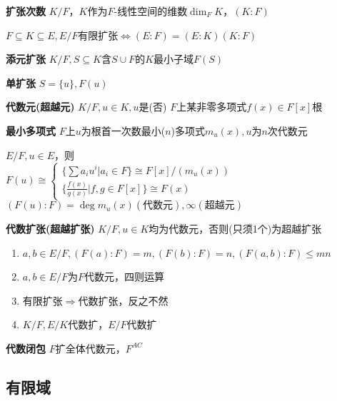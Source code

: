 \documentclass[b4paper, 10pt]{ctexart}
\newcommand*{\impl}{\Rightarrow}
\renewcommand*{\iff}{\Leftrightarrow}
\renewcommand*{\leq}{\leqslant}
\newcommand*{\set}[1]{\{#1\}}
\begin{document}
\begin{multicols}{3}
    \textbf{扩张次数} $K/F$，$K$作为$F$-线性空间的维数$\dim_F K$，$(K:F)$

    \begin{theorem}[链式法则]
        $F\subseteq K \subseteq E, E/F$有限扩张$\iff (E:F)=(E:K)(K:F)$
    \end{theorem}

    \textbf{添元扩张} $K/F, S \!\!\subseteq\!\! K$含$S \!\cup\! F$的$K$最小子域$F(S)$

    \textbf{单扩张} $S = \set{u}, F(u)$

    \textbf{代数元(超越元)} $K/F, u\in K, u$是(否) $F$上某非零多项式$f(x)\in F[x]$根

    \textbf{最小多项式} $F$上$u$为根首一次数最小($n$)多项式$m_u(x), u$为$n$次代数元

    \begin{theorem}[单扩张定理]
        $E/F, u \in E$，则\\
        $F(u) \cong \begin{cases}
                \{ \sum a_i u^i | a_i \in F \} \cong F[x]/(m_u(x)) \\
                \{ \frac{f(x)}{g(x)} | f,g \in F[x] \} \cong F(x)
            \end{cases}$\\
        $(F(u)\!:\!F) = \deg m_u(x) (\text{代数元}), \infty (\text{超越元})$
    \end{theorem}

    \textbf{代数扩张(超越扩张)} $K/F, u \in K$均为代数元，否则(只须1个)为超越扩张

    \begin{theorem}[代数扩张性质]
        \hfil

        \begin{enumerate}
            \item $a, b \in E/F, (F(a)\!:\!F) \! = \! m, (F(b)\!:\!F) \! = \! n, (F(a,b)\!:\!F) \!\leq\! mn$
            \item $a,b \!\in\! E/F$为$F$代数元，四则运算\checkmark
            \item 有限扩张$\impl$代数扩张，反之不然
            \item $K/F, E/K$代数扩，$E/F$代数扩
        \end{enumerate}
    \end{theorem}

    \textbf{代数闭包} $F$扩全体代数元，$F^{AC}$

    \subsection{有限域}


\end{multicols}
\end{document}
